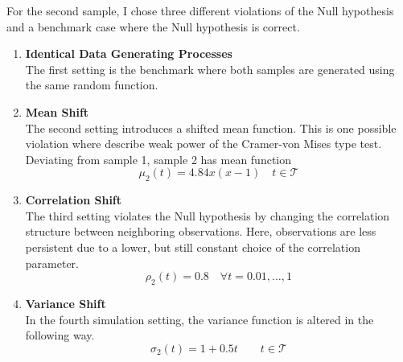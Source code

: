 \documentclass[12pt, a4paper]{article}
\theoremstyle{MAstyle} \newtheorem{assumption}{Assumption}[section]
\theoremstyle{MAstyle} \newtheorem{definition}{Definition}[section]
\theoremstyle{MAstyle} \newtheorem{theorem}{Theorem}[section]
\begin{document}
		For the second sample, I chose three different violations of the Null hypothesis and a benchmark case where the Null hypothesis is correct.
		\begin{enumerate}
			\item \textbf{Identical Data Generating Processes}\\
				  The first setting is the benchmark where both samples are generated using the same random function.
			\item \textbf{Mean Shift}\\
				  The second setting introduces a shifted mean function. This is one possible violation where \cite{bugni_permutation_2021} describe weak power of the Cramer-von Mises type test. Deviating from sample 1, sample 2 has mean function 
				  $$\mu_2(t) = 4.84 x (x-1) \quad t \in \mathcal{T}$$
			\item \textbf{Correlation Shift}\\
			 	  The third setting violates the Null hypothesis by changing the correlation structure between neighboring observations. Here, observations are less persistent due to a lower, but still constant choice of the correlation parameter.
			 	  $$\rho_2(t) = 0.8 \quad \forall t = 0.01, \dots, 1$$
			\item \textbf{Variance Shift}\\
				  In the fourth simulation setting, the variance function is altered in the following way.
				  $$\sigma_2(t) = 1 + 0.5t \quad \quad t \in \mathcal{T}$$
		\end{enumerate}
	
\end{document}
